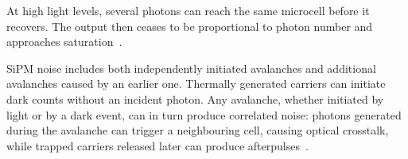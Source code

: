 At high light levels, several photons can reach the same microcell before it recovers. The output then ceases to be proportional to photon number and approaches saturation~\parencite{eckert2012response}.

SiPM noise includes both independently initiated avalanches and additional avalanches caused by an earlier one. Thermally generated carriers can initiate dark counts without an incident photon. Any avalanche, whether initiated by light or by a dark event, can in turn produce correlated noise: photons generated during the avalanche can trigger a neighbouring cell, causing optical crosstalk, while trapped carriers released later can produce afterpulses~\parencite{eckert2010characterisation}.
